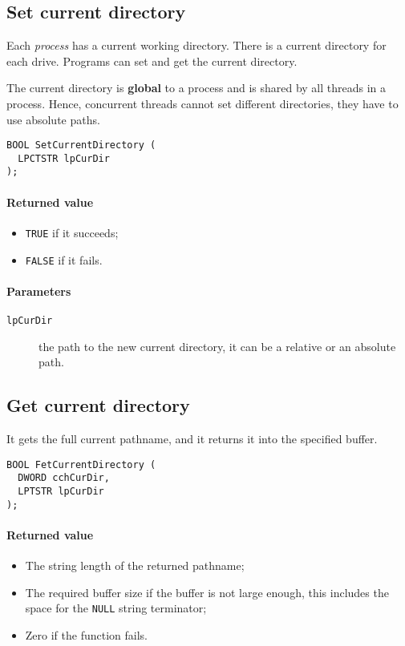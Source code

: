 \subsection{Set current directory}
Each \emph{process} has a current working directory. There is a current directory for each drive. Programs can set and get the current directory.

The current directory is \textbf{global} to a process and is shared by all threads in a process. Hence, concurrent threads cannot set different directories, they have to use absolute paths.

\begin{verbatim}
BOOL SetCurrentDirectory (
  LPCTSTR lpCurDir
);
\end{verbatim}

\paragraph{Returned value}
\begin{itemize}
\item \texttt{TRUE} if it succeeds;
\item \texttt{FALSE} if it fails.
\end{itemize}

\paragraph{Parameters}
\begin{description}
\item [\texttt{lpCurDir}] the path to the new current directory, it can be a relative or an absolute path.
\end{description}

\subsection{Get current directory}
It gets the full current pathname, and it returns it into the specified buffer.

\begin{verbatim}
BOOL FetCurrentDirectory (
  DWORD cchCurDir,
  LPTSTR lpCurDir
);
\end{verbatim}

\paragraph{Returned value}
\begin{itemize}
\item The string length of the returned pathname;
\item The required buffer size if the buffer is not large enough, this includes the space for the \texttt{NULL} string terminator;
\item Zero if the function fails.
\end{itemize}

